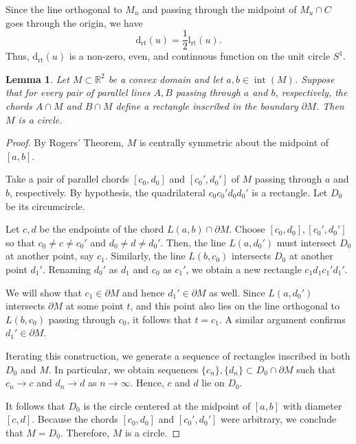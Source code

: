 \documentclass[12pt]{article}
\newtheorem{lemma}{Lemma}
\begin{document}
	Since the line orthogonal to $M_u$ and passing through the midpoint of $M_u \cap C$ goes through the origin, we have
	\[
	\operatorname{d_{rt}}(u) = \frac{1}{2} \operatorname{l_{rt}}(u).
	\]
	Thus, $\operatorname{d_{rt}}(u)$ is a non-zero, even, and continuous function on the unit circle $S^1$.
	
	\begin{lemma}
		Let $M \subset \mathbb{R}^2$ be a convex domain and let $a, b \in \operatorname{int}(M)$. Suppose that for every pair of parallel lines $A, B$ passing through $a$ and $b$, respectively, the chords $A \cap M$ and $B \cap M$ define a rectangle inscribed in the boundary $\partial M$. Then $M$ is a circle.
	\end{lemma}
	
	\begin{proof}
		By Rogers' Theorem, $M$ is centrally symmetric about the midpoint of $[a, b]$.
		
		Take a pair of parallel chords $[c_0, d_0]$ and $[c_0', d_0']$ of $M$ passing through $a$ and $b$, respectively. By hypothesis, the quadrilateral $c_0 c_0' d_0 d_0'$ is a rectangle. Let $D_0$ be its circumcircle.
		
		Let $c, d$ be the endpoints of the chord $L(a, b) \cap \partial M$. Choose $[c_0, d_0], [c_0', d_0']$ so that $c_0 \neq c \neq c_0'$ and $d_0 \neq d \neq d_0'$. Then, the line $L(a, d_0')$ must intersect $D_0$ at another point, say $c_1$. Similarly, the line $L(b, c_0)$ intersects $D_0$ at another point $d_1'$. Renaming $d_0'$ as $d_1$ and $c_0$ as $c_1'$, we obtain a new rectangle $c_1 d_1 c_1' d_1'$.
		
		We will show that $c_1 \in \partial M$ and hence $d_1' \in \partial M$ as well. Since $L(a, d_0')$ intersects $\partial M$ at some point $t$, and this point also lies on the line orthogonal to $L(b, c_0)$ passing through $c_0$, it follows that $t = c_1$. A similar argument confirms $d_1' \in \partial M$.
		
		Iterating this construction, we generate a sequence of rectangles inscribed in both $D_0$ and $M$. In particular, we obtain sequences $\{c_n\}, \{d_n\} \subset D_0 \cap \partial M$ such that $c_n \to c$ and $d_n \to d$ as $n \to \infty$. Hence, $c$ and $d$ lie on $D_0$.
		
		It follows that $D_0$ is the circle centered at the midpoint of $[a, b]$ with diameter $[c, d]$. Because the chords $[c_0, d_0]$ and $[c_0', d_0']$ were arbitrary, we conclude that $M = D_0$. Therefore, $M$ is a circle.
	\end{proof}
	
\end{document}
